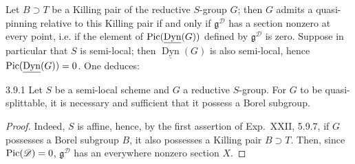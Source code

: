 Let $B\supset T$ be a Killing pair of the reductive $S$-group $G$; then $G$ admits a quasi-pinning relative to this Killing pair if and only if $\mathfrak g^{\mathscr D}$ has a section nonzero at every point, i.e. if the element of $\operatorname{Pic}(\underline{\operatorname{Dyn}}(G))$ defined by $\mathfrak g^{\mathscr D}$ is zero. Suppose in particular that $S$ is semi-local; then $\underline{\operatorname{Dyn}}(G)$ is also semi-local, hence $\operatorname{Pic}(\underline{\operatorname{Dyn}}(G))=0$. One deduces:
\begin{proposition}{3.9.1}\label{XXIV.3.9.1}
Let $S$ be a semi-local scheme and $G$ a reductive $S$-group. For $G$ to be quasi-splittable, it is necessary and sufficient that it possess a Borel subgroup.
\end{proposition}
\begin{proof}
Indeed, $S$ is affine, hence, by the first assertion of Exp.~XXII, 5.9.7, if $G$ possesses a Borel subgroup $B$, it also possesses a Killing pair $B\supset T$. Then, since $\operatorname{Pic}(\mathscr D)=0$, $\mathfrak g^{\mathscr D}$ has an everywhere nonzero section $X$.
\end{proof}
